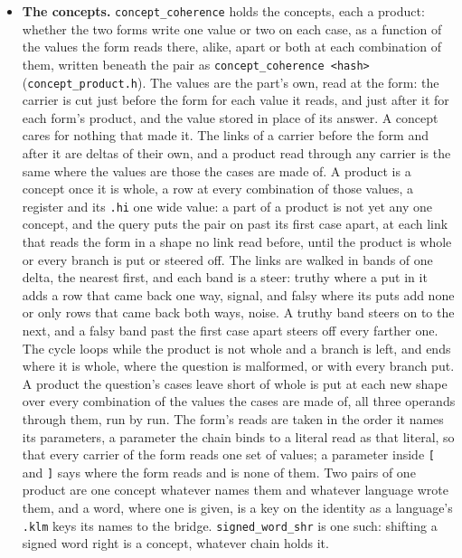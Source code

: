 \begin{itemize}
\item \textbf{The concepts.} \texttt{concept\_\allowbreak{}coherence} holds the concepts, each a product: whether the two forms write one value or two on each case, as a function of the values the form reads there, alike, apart or both at each combination of them, written beneath the pair as \texttt{concept\_\allowbreak{}coherence <hash>} (\texttt{concept\_\allowbreak{}product.\allowbreak{}h}). The values are the part's own, read at the form: the carrier is cut just before the form for each value it reads, and just after it for each form's product, and the value stored in place of its answer. A concept cares for nothing that made it. The links of a carrier before the form and after it are deltas of their own, and a product read through any carrier is the same where the values are those the cases are made of. A product is a concept once it is whole, a row at every combination of those values, a register and its \texttt{.\allowbreak{}hi} one wide value: a part of a product is not yet any one concept, and the query puts the pair on past its first case apart, at each link that reads the form in a shape no link read before, until the product is whole or every branch is put or steered off. The links are walked in bands of one delta, the nearest first, and each band is a steer: truthy where a put in it adds a row that came back one way, signal, and falsy where its puts add none or only rows that came back both ways, noise. A truthy band steers on to the next, and a falsy band past the first case apart steers off every farther one. The cycle loops while the product is not whole and a branch is left, and ends where it is whole, where the question is malformed, or with every branch put. A product the question's cases leave short of whole is put at each new shape over every combination of the values the cases are made of, all three operands through them, run by run. The form's reads are taken in the order it names its parameters, a parameter the chain binds to a literal read as that literal, so that every carrier of the form reads one set of values; a parameter inside \texttt{[} and \texttt{]} says where the form reads and is none of them. Two pairs of one product are one concept whatever names them and whatever language wrote them, and a word, where one is given, is a key on the identity as a language's \texttt{.\allowbreak{}klm} keys its names to the bridge. \texttt{signed\_\allowbreak{}word\_\allowbreak{}shr} is one such: shifting a signed word right is a concept, whatever chain holds it.

\end{itemize}
